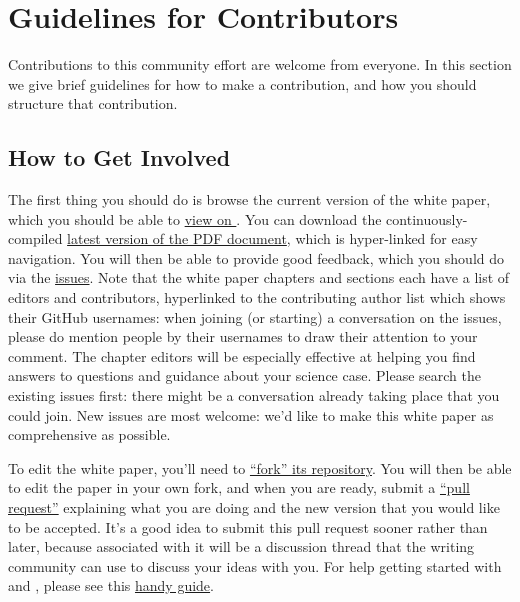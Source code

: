 \navigationbar



\section{Guidelines for Contributors}
\def\secname{intro:guidelines}\label{sec:\secname}


Contributions to this community effort are welcome from everyone. In
this section we give brief guidelines for how to make a contribution,
and how you should structure that contribution.

\subsection{How to Get Involved}

The first thing you should do is browse the current version of the white
paper, which you should be able to \href{http://ls.st/iw2}{view on
\GitHub}. You can download the  continuously-compiled
\href{http://www.slac.stanford.edu/~digel/ObservingStrategy/whitepaper/LSST_Observing_Strategy_White_Paper.pdf}{latest
version of the PDF document}, which is hyper-linked for easy navigation.
You will then be able to provide good feedback, which you should do via
the
\href{https://github.com/LSSTScienceCollaborations/ObservingStrategy/issues}{\GitHub
issues}. Note that the white paper chapters and sections each have a
list of editors and contributors, hyperlinked to the contributing author
list which shows their GitHub usernames: when joining (or starting) a
conversation on the issues, please do {\@}mention people by
their usernames to draw their attention to your comment. The chapter
editors will be especially effective at helping you find answers to
questions and guidance about your science case. Please search the
existing issues first: there might be a
conversation already taking place that you could join. New issues are
most welcome: we'd like to make this white paper as comprehensive as
possible.

To edit the white paper, you'll need to
\href{https://help.github.com/articles/fork-a-repo/}{``fork'' its
repository}. You will then  be able to edit the paper in your own
fork, and when you are ready,  submit a
\href{https://help.github.com/articles/using-pull-requests/}{``pull
request''} explaining what you are doing and the new version that  you
would like to be accepted. It's a good idea to submit this pull
request sooner rather than later, because associated with it will be a
discussion thread that the writing community can use to discuss your
ideas with you. For help getting started with \git and \GitHub, please
see this
\href{https://github.com/drphilmarshall/GettingStarted#top}{handy
guide}.


